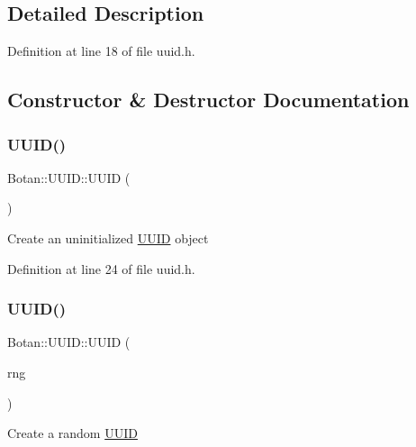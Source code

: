 \subsection{Detailed Description}


Definition at line 18 of file uuid.\+h.



\subsection{Constructor \& Destructor Documentation}
\mbox{\label{class_botan_1_1_u_u_i_d_a1e8e37568ead09e587ca96cebcbab9d2}} 
\subsubsection{\texorpdfstring{U\+U\+I\+D()}{UUID()}\hspace{0.1cm}{\footnotesize\ttfamily [1/4]}}
{\footnotesize\ttfamily Botan\+::\+U\+U\+I\+D\+::\+U\+U\+ID (\begin{DoxyParamCaption}{ }\end{DoxyParamCaption})\hspace{0.3cm}{\ttfamily [inline]}}

Create an uninitialized \mbox{\hyperlink{class_botan_1_1_u_u_i_d}{U\+U\+ID}} object 

Definition at line 24 of file uuid.\+h.

\mbox{\label{class_botan_1_1_u_u_i_d_a97713e2316b1c612813bb03c66dcbbb6}} 
\subsubsection{\texorpdfstring{U\+U\+I\+D()}{UUID()}\hspace{0.1cm}{\footnotesize\ttfamily [2/4]}}
{\footnotesize\ttfamily Botan\+::\+U\+U\+I\+D\+::\+U\+U\+ID (\begin{DoxyParamCaption}\item[{Random\+Number\+Generator \&}]{rng }\end{DoxyParamCaption})}

Create a random \mbox{\hyperlink{class_botan_1_1_u_u_i_d}{U\+U\+ID}} 

